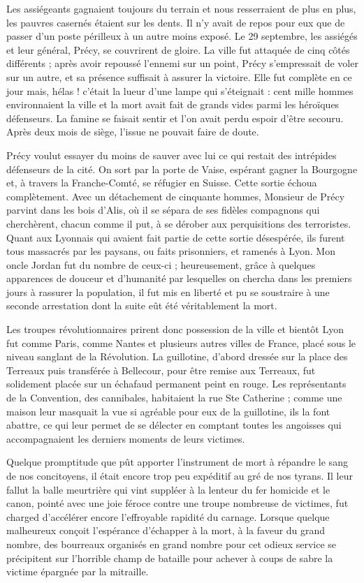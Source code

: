 \documentclass[11pt,a4paper]{report}
\begin{document}
Les assiégeants gagnaient toujours du terrain et nous resserraient de plus en plus, les pauvres casernés étaient sur les dents. Il n'y avait de repos pour eux que de passer d'un poste périlleux à un autre moins exposé. Le 29 septembre, les assiégés et leur général, Précy, se couvrirent de gloire. La ville fut attaquée de cinq côtés différents ; après avoir repoussé l'ennemi sur un point, Précy s'empressait de voler sur un autre, et sa présence suffisait à assurer la victoire. Elle fut complète en ce jour mais, hélas ! c'était la lueur d'une lampe qui s'éteignait : cent mille hommes environnaient la ville et la mort avait fait de grands vides parmi les héroïques défenseurs. La famine se faisait sentir et l'on avait perdu espoir d'être secouru. Après deux mois de siège, l'issue ne pouvait faire de doute.

Précy voulut essayer du moins de sauver avec lui ce qui restait des intrépides défenseurs de la cité. On sort par la porte de Vaise, espérant gagner la Bourgogne et, à travers la Franche-Comté, se réfugier en Suisse. Cette sortie échoua complètement. Avec un détachement de cinquante hommes, Monsieur de Précy parvint dans les bois d'Alis, où il se sépara de ses fidèles compagnons qui cherchèrent, chacun comme il put, à se dérober aux perquisitions des terroristes. Quant aux Lyonnais qui avaient fait partie de cette sortie désespérée, ils furent tous massacrés par les paysans, ou faits prisonniers, et ramenés à Lyon. Mon oncle Jordan fut du nombre de ceux-ci ; heureusement, grâce à quelques apparences de douceur et d'humanité par lesquelles on chercha dans les premiers jours à rassurer la population, il fut mis en liberté et pu se soustraire à une seconde arrestation dont la suite eût été véritablement la mort.

Les troupes révolutionnaires prirent donc possession de la ville et bientôt Lyon fut comme Paris, comme Nantes et plusieurs autres villes de France, placé sous le niveau sanglant de la Révolution. La guillotine, d'abord dressée sur la place des Terreaux puis transférée à Bellecour, pour être remise aux Terreaux, fut solidement placée sur un échafaud permanent peint en rouge. Les représentants de la Convention, des cannibales, habitaient la rue Ste Catherine ; comme une maison leur masquait la vue si agréable pour eux de la guillotine, ils la font abattre, ce qui leur permet de se délecter en comptant toutes les angoisses qui accompagnaient les derniers moments de leurs victimes.

Quelque promptitude que pût apporter l'instrument de mort à répandre le sang de nos concitoyens, il était encore trop peu expéditif au gré de nos tyrans. Il leur fallut la balle meurtrière qui vint suppléer à la lenteur du fer homicide et le canon, pointé avec une joie féroce contre une troupe nombreuse de victimes, fut charged d'accélérer encore l'effroyable rapidité du carnage. Lorsque quelque malheureux conçoit l'espérance d'échapper à la mort, à la faveur du grand nombre, des bourreaux organisés en grand nombre pour cet odieux service se précipitent sur l'horrible champ de bataille pour achever à coups de sabre la victime épargnée par la mitraille.
\end{document}
